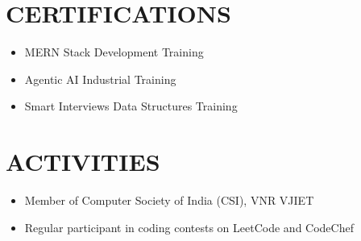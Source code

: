 \documentclass[letterpaper,11pt]{article}
\begin{document}
\section*{CERTIFICATIONS}

\begin{itemize}
\item MERN Stack Development Training
\item Agentic AI Industrial Training
\item Smart Interviews Data Structures Training
\end{itemize}

\section*{ACTIVITIES}

\begin{itemize}
\item Member of Computer Society of India (CSI), VNR VJIET
\item Regular participant in coding contests on LeetCode and CodeChef
\end{itemize}
\end{document}
